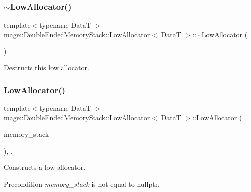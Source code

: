 \subsubsection{\texorpdfstring{$\sim$\+Low\+Allocator()}{~LowAllocator()}}
{\footnotesize\ttfamily template$<$typename DataT $>$ \\
\hyperlink{structmage_1_1_double_ended_memory_stack_1_1_low_allocator}{mage\+::\+Double\+Ended\+Memory\+Stack\+::\+Low\+Allocator}$<$ DataT $>$\+::$\sim$\hyperlink{structmage_1_1_double_ended_memory_stack_1_1_low_allocator}{Low\+Allocator} (\begin{DoxyParamCaption}{ }\end{DoxyParamCaption})\hspace{0.3cm}{\ttfamily [default]}}

Destructs this low allocator. \hypertarget{structmage_1_1_double_ended_memory_stack_1_1_low_allocator_a7c9da2fad702eedb0bb16de047c99238}{}\label{structmage_1_1_double_ended_memory_stack_1_1_low_allocator_a7c9da2fad702eedb0bb16de047c99238} 
\subsubsection{\texorpdfstring{Low\+Allocator()}{LowAllocator()}\hspace{0.1cm}{\footnotesize\ttfamily [4/4]}}
{\footnotesize\ttfamily template$<$typename DataT $>$ \\
\hyperlink{structmage_1_1_double_ended_memory_stack_1_1_low_allocator}{mage\+::\+Double\+Ended\+Memory\+Stack\+::\+Low\+Allocator}$<$ DataT $>$\+::\hyperlink{structmage_1_1_double_ended_memory_stack_1_1_low_allocator}{Low\+Allocator} (\begin{DoxyParamCaption}\item[{\hyperlink{classmage_1_1_double_ended_memory_stack}{Double\+Ended\+Memory\+Stack} $\ast$}]{memory\+\_\+stack }\end{DoxyParamCaption})\hspace{0.3cm}{\ttfamily [explicit]}, {\ttfamily [private]}, {\ttfamily [noexcept]}}

Constructs a low allocator.

\begin{DoxyPrecond}{Precondition}
{\itshape memory\+\_\+stack} is not equal to {\ttfamily nullptr}. 
\end{DoxyPrecond}

